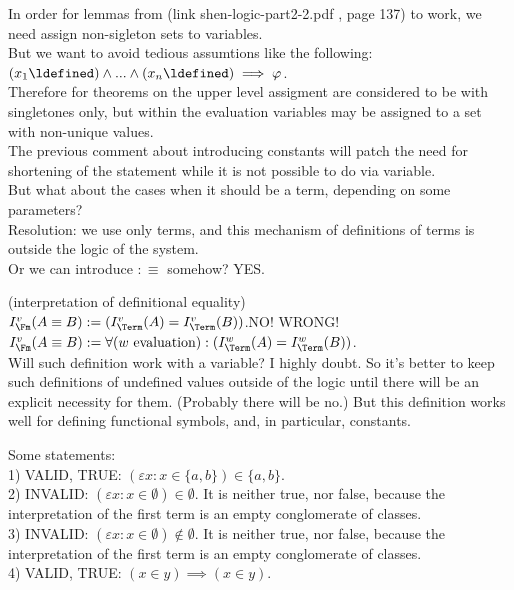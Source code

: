 In order for lemmas from (link shen-logic-part2-2.pdf , page 137) to work, we need assign non-sigleton sets to variables.\\
But we want to avoid tedious assumtions like the following:
$(x_1\ldefined)\land...\land(x_n\ldefined)\implies \varphi$.\\
Therefore for theorems on the upper level assigment are considered to be with singletones only, but within the evaluation variables may be assigned to a set with non-unique values.\\
The previous comment about introducing constants will patch the need for shortening of the statement while it is not possible to do via variable.\\
But what about the cases when it should be a term, depending on some parameters?\\
Resolution: we use only terms, and this mechanism of definitions of terms is outside the logic of the system.\\
Or we can introduce $:\equiv$ somehow? YES.\\%

\begin{definition}(interpretation of definitional equality)\\
\st{$I^v_\Fm(A\equiv B):=(I^v_\Term(A) = I^v_\Term(B))$}.NO! WRONG!\\
$I^v_\Fm(A\equiv B):=\forall(w\ \mbox{evaluation}):(I^w_\Term(A) = I^w_\Term(B))$.\\
Will such definition work with a variable? I highly doubt. 
So it's better to keep such definitions of undefined values outside of the logic until there will be an explicit necessity for them. (Probably there will be no.)
But this definition works well for defining functional symbols, and, in particular, constants.
\end{definition}

Some statements:\\
1) VALID, TRUE: $(\varepsilon x: x \in \{a,b\})\in \{a,b\}$.\\
2) INVALID: $(\varepsilon x: x \in \emptyset) \in \emptyset$. It is neither true, nor false, because the interpretation of the first term is an empty conglomerate of classes.\\
3) INVALID: $(\varepsilon x: x \in \emptyset) \notin \emptyset$. It is neither true, nor false, because the interpretation of the first term is an empty conglomerate of classes.\\
4) VALID, TRUE: $(x\in y) \implies (x\in y)$.

